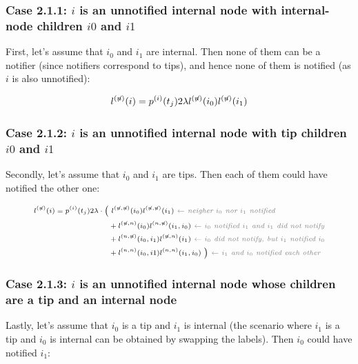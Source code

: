\documentclass[a4paper,10pt]{article}
\begin{document}
\subsubsection*{Case 2.1.1: $i$ is an unnotified internal node with internal-node children $i0$ and $i1$}

First, let's assume that $i_0$ and $i_1$ are internal. Then none of them can be a notifier (since notifiers correspond to tips), and hence none of them is notified (as $i$ is also unnotified):

\begin{equation}
\scriptsize
l^{(\not{n})}(i) = p^{(i)}(t_j) 2\lambda l^{(\not{n})}(i_0)l^{(\not{n})}(i_1) \label{eq:lu-int-int}
\end{equation}

\subsubsection*{Case 2.1.2: $i$ is an unnotified internal node with tip children $i0$ and $i1$}

Secondly, let's assume that $i_0$ and $i_1$ are tips. Then each of them could have notified the other one:

\begin{equation}
\scriptsize
\begin{split}
l^{(\not{n})}(i) = p^{(i)}(t_j) 2\lambda \cdot 
\Big(&~l^{(\not{n},\not{n})}(i_0)l^{(\not{n},\not{n})}(i_1) \textit{\color{gray}~$\leftarrow$ neigher $i_0$ nor $i_1$ notified} \\
&+ l^{(\not{n},n)}(i_0)l^{(n,\not{n})}(i_1,i_0) \textit{\color{gray}~$\leftarrow$ $i_0$ notified $i_1$ and $i_1$ did not notify} \\
&+ l^{(n,\not{n})}(i_0,i_1)l^{(\not{n},n)}(i_1) \textit{\color{gray}~$\leftarrow$ $i_0$ did not notify, but $i_1$ notified $i_0$} \\
&+ l^{(n,n)}(i_0,i1)l^{(n,n)}(i_1,i_0)~\Big) \textit{\color{gray}~$\leftarrow$ $i_1$ and $i_0$ notified each other} \\
\end{split}\label{eq:lu-tip-tip}
\end{equation}

\subsubsection*{Case 2.1.3: $i$ is an unnotified internal node whose children are a tip and an internal node}
Lastly, let's assume that $i_0$ is a tip and $i_1$ is internal (the scenario where $i_1$ is a tip and $i_0$ is internal can be obtained by swapping the labels). Then $i_0$ could have notified $i_1$:
\end{document}
